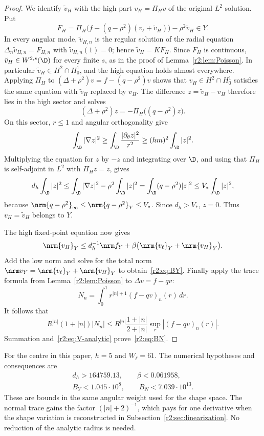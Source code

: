\begin{proof}
We identify $\tilde v_H$ with the high part $v_H=\Pi_Hv$ of the original $L^2$ solution. Put
\[
 F_H=\Pi_H\bigl(f-(q-\rho^2)(v_\ell+\tilde v_H)\bigr)-\rho^2\tilde v_H\in Y.
\]
In every angular mode, $\tilde v_{H,n}$ is the regular solution of the radial equation $\Delta_n\tilde v_{H,n}=F_{H,n}$ with $\tilde v_{H,n}(1)=0$; hence $\tilde v_H=KF_H$. Since $F_H$ is continuous, $\tilde v_H\in W^{2,s}(\D)$ for every finite $s$, as in the proof of Lemma~\ref{r2:lem:Poisson}. In particular $\tilde v_H\in H^2\cap H^1_0$, and the high equation holds almost everywhere. Applying $\Pi_H$ to $(\Delta+\rho^2)v=f-(q-\rho^2)v$ shows that $v_H\in H^2\cap H^1_0$ satisfies the same equation with $\tilde v_H$ replaced by $v_H$. The difference $z=\tilde v_H-v_H$ therefore lies in the high sector and solves
\[
 (\Delta+\rho^2)z=-\Pi_H\bigl((q-\rho^2)z\bigr).
\]
On this sector, $r\le1$ and angular orthogonality give
\[
 \int_\D|\nabla z|^2\ge\int_\D\frac{|\partial_\theta z|^2}{r^2}
 \ge(hm)^2\int_\D|z|^2.
\]
Multiplying the equation for $z$ by $-z$ and integrating over $\D$, and using that $\Pi_H$ is self-adjoint in $L^2$ with $\Pi_Hz=z$, gives
\[
 d_h\int_\D|z|^2\le\int_\D|\nabla z|^2-\rho^2\int_\D|z|^2
 =\int_\D(q-\rho^2)|z|^2
 \le V_*\int_\D|z|^2,
\]
because $\nrm{q-\rho^2}_\infty\le\nrm{q-\rho^2}_Y\le V_*$. Since $d_h>V_*$, $z=0$. Thus $v_H=\tilde v_H$ belongs to $Y$.

The high fixed-point equation now gives
\[
 \nrm{v_H}_Y\le d_h^{-1}\nrm f_Y
 +\beta\bigl(\nrm{v_\ell}_Y+\nrm{v_H}_Y\bigr).
\]
Add the low norm and solve for the total norm $\nrm v_Y=\nrm{v_\ell}_Y+\nrm{v_H}_Y$ to obtain~\eqref{r2:eq:BY}. Finally apply the trace formula from Lemma~\ref{r2:lem:Poisson} to $\Delta v=f-qv$:
\begin{equation}\label{r2:eq:normal-moment}
 N_n=\int_0^1r^{|n|+1}(f-qv)_n(r)\,dr.
\end{equation}
It follows that
\[
 R^{|n|}(1+|n|)|N_n|
 \le R^{|n|}\frac{1+|n|}{2+|n|}\sup_r|(f-qv)_n(r)|.
\]
Summation and~\eqref{r2:eq:V-analytic} prove~\eqref{r2:eq:BN}.
\end{proof}

For the centre in this paper, $h=5$ and $W_\ell=61$. The numerical hypotheses and consequences are
\begin{equation}\label{r2:eq:Y-numbers}
 \begin{gathered}
 d_h>164759.13,\qquad\beta<0.061958,\\
 B_Y<1.045\cdot10^8,\qquad B_N<7.039\cdot10^{13}.
 \end{gathered}
\end{equation}
These are bounds in the same angular weight used for the shape space. The normal trace gains the factor $(|n|+2)^{-1}$, which pays for one derivative when the shape variation is reconstructed in Subsection~\ref{r2:sec:linearization}. No reduction of the analytic radius is needed.
